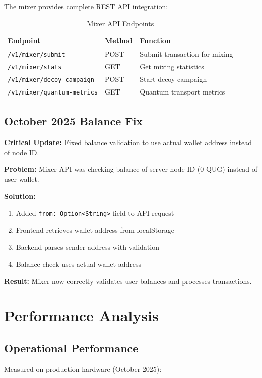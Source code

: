 \documentclass[12pt,a4paper]{article}
\begin{document}
The mixer provides complete REST API integration:

\begin{table}[h]
\centering
\begin{tabular}{lll}
\toprule
Endpoint & Method & Function \\
\midrule
\texttt{/v1/mixer/submit} & POST & Submit transaction for mixing \\
\texttt{/v1/mixer/stats} & GET & Get mixing statistics \\
\texttt{/v1/mixer/decoy-campaign} & POST & Start decoy campaign \\
\texttt{/v1/mixer/quantum-metrics} & GET & Quantum transport metrics \\
\bottomrule
\end{tabular}
\caption{Mixer API Endpoints}
\end{table}

\subsection{October 2025 Balance Fix}

\textbf{Critical Update:} Fixed balance validation to use actual wallet address instead of node ID.

\textbf{Problem:} Mixer API was checking balance of server node ID (0 QUG) instead of user wallet.

\textbf{Solution:}
\begin{enumerate}
\item Added \texttt{from: Option<String>} field to API request
\item Frontend retrieves wallet address from localStorage
\item Backend parses sender address with validation
\item Balance check uses actual wallet address
\end{enumerate}

\textbf{Result:} Mixer now correctly validates user balances and processes transactions.

\section{Performance Analysis}

\subsection{Operational Performance}

Measured on production hardware (October 2025):
\end{document}

